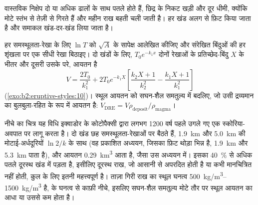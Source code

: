 वास्तविक निक्षेप दो या अधिक ढालों के साथ पतले होते हैं, छिद्र के निकट खड़ी और दूर
धीमी, क्योंकि मोटे  स्तंभ से तेज़ी से गिरते हैं और महीन राख
बहती चली जाती है। हर खंड अलग से फ़िट किया जाता है और समाकल खंड-दर-खंड
लिया जाता है।

\begin{method}\label{met:b2:eruptive-styles:volume}
हर समस्थूलता-रेखा के लिए $\ln T$ को $\sqrt A$ के सापेक्ष आलेखित कीजिए और संरेखित बिंदुओं की हर
शृंखला पर एक सीधी रेखा बिठाइए। दो खंडों के लिए, $T_0e^{-k_1x}$ दोनों रेखाओं के
प्रतिच्छेद-बिंदु $X$ के भीतर और दूसरी उसके परे, आयतन है
\[
V = \frac{2T_0}{k_1^2} + 2T_0e^{-k_1X}\left[\frac{k_2X + 1}{k_2^2} -
\frac{k_1X + 1}{k_1^2}\right]
\]
(\cref{exo:b2:eruptive-styles:10})। स्थूल आयतन को सघन-शैल समतुल्य में बदलिए, जो
उसी द्रव्यमान का बुलबुला-रहित  के रूप में आयतन है: $V_{\mathrm{DRE}} = V\rho_{\mathrm{deposit}}/\rho_{\mathrm{magma}}$।
\end{method}

नीचे का चित्र यह विधि इक्वाडोर के कोटोपैक्सी द्वारा लगभग \num{1200} वर्ष पहले
उगले गए एक स्कोरिया-अवपात पर लागू करता है। दो खंड छह समस्थूलता-रेखाओं पर बैठते हैं,
\qty{1.9}{km} और \qty{5.0}{km} की मोटाई-अर्धदूरियों $\ln 2/k$ के साथ (वह
प्रकाशित अध्ययन, जिसका फ़िट थोड़ा भिन्न है, \qty{1.9}{km} और
\qty{5.3}{km} पाता है), और आयतन \qty{0.29}{km^3} आता है, जैसा उस अध्ययन में। इसका
\qty{40}{\percent} से अधिक पतले दूरस्थ खंड में पड़ता है, इसीलिए दूरस्थ राख,
जो आसानी से अपरदित होती है या कभी मानचित्रित नहीं होती, कुल के लिए इतनी महत्त्वपूर्ण है। ताज़ा गिरी राख
का स्थूल घनत्व \qtyrange{500}{1500}{kg/m^3} है,  के घनत्व से काफ़ी
नीचे, इसलिए सघन-शैल समतुल्य मोटे तौर पर स्थूल आयतन का आधा या उससे कम होता है।

